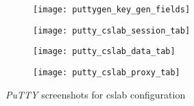 \documentclass[12pt]{article}
\begin{document}
\begin{flushleft}
\newpage

\begin{figure}[bh!]
\centering
\begin{subfigure}{.5\textwidth}
  \centering
  \texttt{[image: puttygen\_key\_gen\_fields]}
  \label{fig:sub1}
\end{subfigure}%
\begin{subfigure}{.5\textwidth}
  \centering
  \texttt{[image: putty\_cslab\_session\_tab]}
  \label{fig:sub2}
\end{subfigure}
\begin{subfigure}{.5\textwidth}
  \centering
  \texttt{[image: putty\_cslab\_data\_tab]}
  \label{fig:sub3}
\end{subfigure}%
\begin{subfigure}{.5\textwidth}
  \centering
  \texttt{[image: putty\_cslab\_proxy\_tab]}
  \label{fig:sub4}
\end{subfigure}%
\caption{\textit{PuTTY} screenshots for cslab configuration}
\label{fig:putty_config}
\end{figure}

\newpage

\end{flushleft}
\end{document}
